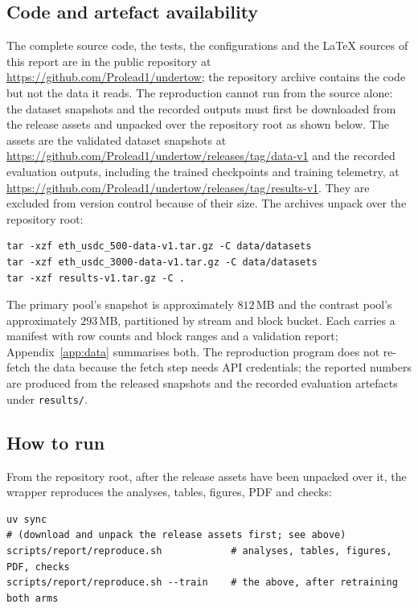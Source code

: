 \subsection{Code and artefact availability}

The complete source code, the tests, the configurations and the LaTeX sources
of this report are in the public repository at
\url{https://github.com/Prolead1/undertow}; the repository archive contains the
code but not the data it reads. The reproduction cannot run from the source
alone: the dataset snapshots and the recorded outputs must first be downloaded
from the release assets and unpacked over the repository root as shown below.
The assets are the validated dataset snapshots at
\url{https://github.com/Prolead1/undertow/releases/tag/data-v1} and the
recorded evaluation outputs, including the trained checkpoints and training
telemetry, at
\url{https://github.com/Prolead1/undertow/releases/tag/results-v1}. They are
excluded from version control because of their size. The archives unpack over
the repository root:

{\footnotesize
\begin{verbatim}
tar -xzf eth_usdc_500-data-v1.tar.gz -C data/datasets
tar -xzf eth_usdc_3000-data-v1.tar.gz -C data/datasets
tar -xzf results-v1.tar.gz -C .
\end{verbatim}
}

The primary pool's snapshot is approximately $812$\,MB and the contrast
pool's approximately $293$\,MB, partitioned by stream and block bucket. Each
carries a manifest with row counts and block ranges and a validation report;
Appendix~\ref{app:data} summarises both. The reproduction program does not
re-fetch the data because the fetch step needs API credentials; the reported
numbers are produced from the released snapshots and the recorded evaluation
artefacts under \texttt{results/}.

\subsection{How to run}

From the repository root, after the release assets have been unpacked over it,
the wrapper reproduces the analyses, tables, figures, PDF and checks:

{\footnotesize
\begin{verbatim}
uv sync
# (download and unpack the release assets first; see above)
scripts/report/reproduce.sh            # analyses, tables, figures, PDF, checks
scripts/report/reproduce.sh --train    # the above, after retraining both arms
\end{verbatim}
}

